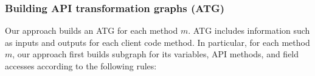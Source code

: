 \subsubsection{Building API transformation graphs (ATG)} 

Our approach builds an ATG for each method $m$. ATG includes information such as
inputs and outputs for each client code method. In particular, for
each method $m$, our approach first builds subgraph for its variables,
API methods, and field accesses according to the following rules:




%


